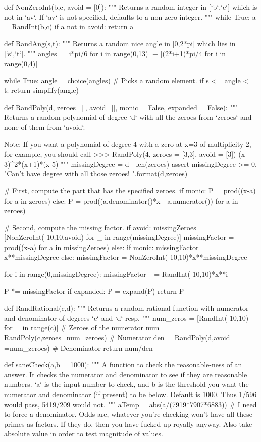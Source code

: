 \begin{sagesilent}
def NonZeroInt(b,c, avoid = [0]):
    """ Returns a random integer in [`b`,`c`] which is not in `av`. 
        If `av` is not specified, defaults to a non-zero integer.
    """
    while True:
        a = RandInt(b,c)
        if a not in avoid:
            return a

def RandAng(s,t):
    """ Returns a random nice angle in [0,2*pi] which lies in [`s`,`t`].
    """
    angles = [i*pi/6 for i in range(0,13)] + [(2*i+1)*pi/4 for i in range(0,4)]

    while True:
        angle = choice(angles) # Picks a random element.
        if s <= angle <= t:
            return simplify(angle)

def RandPoly(d, zeroes=[], avoid=[], monic = False, expanded = False):
    """ Returns a random polynomial of degree `d` with all the zeroes from
        `zeroes` and none of them from `avoid`.

        Note: If you want a polynomial of degree 4 with a zero at x=3 of
        multiplicity 2, for example, you should call
        >>> RandPoly(4, zeroes = [3,3], avoid = [3])
        (x-3)^2*(x+1)*(x-5)
    """
    missingDegree = d - len(zeroes)
    assert missingDegree >= 0, "Can't have degree {} with all those zeroes! {}".format(d,zeroes)

    # First, compute the part that has the specified zeroes.
    if monic:
        P = prod((x-a) for a in zeroes)
    else:
        P = prod((a.denominator()*x - a.numerator()) for a in zeroes)

    # Second, compute the missing factor.
    if avoid:
        missingZeroes =[NonZeroInt(-10,10,avoid) for _ in range(missingDegree)]
        missingFactor = prod((x-a) for a in missingZeroes)
    else:
        if monic:
            missingFactor = x**missingDegree
        else:
            missingFactor = NonZeroInt(-10,10)*x**missingDegree

        for i in range(0,missingDegree):
            missingFactor += RandInt(-10,10)*x**i
        
    P *= missingFactor
    if expanded:
        P = expand(P)
    return P

def RandRational(c,d):
    """ Returns a random rational function with numerator and denominator of degrees `c` and `d` resp.
    """
    num_zeros = [RandInt(-10,10) for _ in range(c)] # Zeroes of the numerator
    num = RandPoly(c,zeroes=num_zeroes) # Numerator
    den = RandPoly(d,avoid =num_zeroes) # Denominator
    return num/den

def saneCheck(a,b = 1000):
    """ A function to check the reasonable-ness of an answer. It checks the 
        numerator and denominator to see if they are reasonable numbers. `a` is 
        the input number to check, and b is the threshold you want the numerator
        and denominator (if present) to be below. Default is 1000. Thus 1/596
        would pass, 5419/209 would not.
    """
    aTemp = abs(a/(7919*7907*6883)) # I need to force a denominator. Odds are, whatever you're checking won't have all these primes as factors. If they do, then you have fucked up royally anyway. Also take absolute value in order to test magnitude of values.
    

\end{sagesilent}
